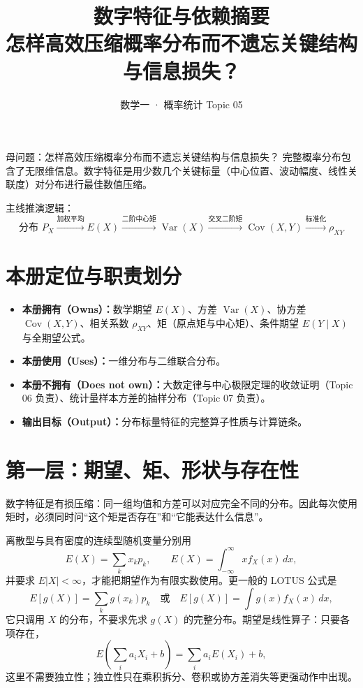 \documentclass[11pt,a4paper]{ctexart}
\title{\vspace{-1.1cm}\textbf{数字特征与依赖摘要}\\[0.4em]
\large 怎样高效压缩概率分布而不遗忘关键结构与信息损失？}
\author{数学一 · 概率统计 Topic 05}
\date{}
\newcommand{\kw}[1]{\textbf{\color{deep}#1}}
\begin{document}
\maketitle

\begin{corebox}{母问题：怎样高效压缩概率分布而不遗忘关键结构与信息损失？}
完整概率分布包含了无限维信息。数字特征是用少数几个关键标量（中心位置、波动幅度、线性关联度）对分布进行最佳数值压缩。

主线推演逻辑：
\[
\boxed{
\text{分布 } P_X \xrightarrow{\text{加权平均}} E(X) \xrightarrow{\text{二阶中心矩}} \operatorname{Var}(X) \xrightarrow{\text{交叉二阶矩}} \operatorname{Cov}(X,Y) \xrightarrow{\text{标准化}} \rho_{XY}
}
\]
\end{corebox}

\section{本册定位与职责划分}

\begin{itemize}
  \item \kw{本册拥有（Owns）：}数学期望 $E(X)$、方差 $\operatorname{Var}(X)$、协方差 $\operatorname{Cov}(X,Y)$、相关系数 $\rho_{XY}$、矩（原点矩与中心矩）、条件期望 $E(Y \mid X)$ 与全期望公式。
  \item \kw{本册使用（Uses）：}一维分布与二维联合分布。
  \item \kw{本册不拥有（Does not own）：}大数定律与中心极限定理的收敛证明（Topic 06 负责）、统计量样本方差的抽样分布（Topic 07 负责）。
  \item \kw{输出目标（Output）：}分布标量特征的完整算子性质与计算链条。
\end{itemize}

\section{第一层：期望、矩、形状与存在性}

数字特征是有损压缩：同一组均值和方差可以对应完全不同的分布。因此每次使用矩时，必须同时问“这个矩是否存在”和“它能表达什么信息”。

离散型与具有密度的连续型随机变量分别用
\[
E(X)=\sum_kx_kp_k,\qquad E(X)=\int_{-\infty}^{\infty}xf_X(x)\,dx,
\]
并要求 $E|X|<\infty$，才能把期望作为有限实数使用。更一般的 LOTUS 公式是
\[
\boxed{E[g(X)]=\sum_kg(x_k)p_k\quad\text{或}\quad E[g(X)]=\int g(x)f_X(x)\,dx},
\]
它只调用 $X$ 的分布，不要求先求 $g(X)$ 的完整分布。期望是线性算子：只要各项存在，
\[
E\!\left(\sum_i a_iX_i+b\right)=\sum_i a_iE(X_i)+b,
\]
这里不需要独立性；独立性只在乘积拆分、卷积或协方差消失等更强动作中出现。
\end{document}
